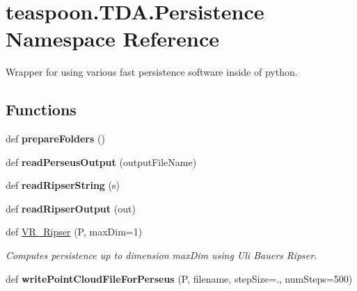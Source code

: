 \hypertarget{namespaceteaspoon_1_1_t_d_a_1_1_persistence}{}\section{teaspoon.\+T\+D\+A.\+Persistence Namespace Reference}
\label{namespaceteaspoon_1_1_t_d_a_1_1_persistence}


Wrapper for using various fast persistence software inside of python.  


\subsection*{Functions}
\begin{DoxyCompactItemize}
\item 
def {\bfseries prepare\+Folders} ()\hypertarget{namespaceteaspoon_1_1_t_d_a_1_1_persistence_aa767596a9f61323ef4e489e42890cd45}{}\label{namespaceteaspoon_1_1_t_d_a_1_1_persistence_aa767596a9f61323ef4e489e42890cd45}

\item 
def {\bfseries read\+Perseus\+Output} (output\+File\+Name)\hypertarget{namespaceteaspoon_1_1_t_d_a_1_1_persistence_a3d273210437e69be2df595ed1751c661}{}\label{namespaceteaspoon_1_1_t_d_a_1_1_persistence_a3d273210437e69be2df595ed1751c661}

\item 
def {\bfseries read\+Ripser\+String} (s)\hypertarget{namespaceteaspoon_1_1_t_d_a_1_1_persistence_a862eea03c953145bb9290c1681f1f850}{}\label{namespaceteaspoon_1_1_t_d_a_1_1_persistence_a862eea03c953145bb9290c1681f1f850}

\item 
def {\bfseries read\+Ripser\+Output} (out)\hypertarget{namespaceteaspoon_1_1_t_d_a_1_1_persistence_a4ea0e5c0180eff1391c4ac0cf126694c}{}\label{namespaceteaspoon_1_1_t_d_a_1_1_persistence_a4ea0e5c0180eff1391c4ac0cf126694c}

\item 
def \hyperlink{namespaceteaspoon_1_1_t_d_a_1_1_persistence_ae38f90d312da5c7fb8587a2f44e67b8a}{V\+R\+\_\+\+Ripser} (P, max\+Dim=1)
\begin{DoxyCompactList}\small\item\em Computes persistence up to dimension max\+Dim using Uli Bauer\textquotesingle{}s Ripser. \end{DoxyCompactList}\item 
def {\bfseries write\+Point\+Cloud\+File\+For\+Perseus} (P, filename, step\+Size=., num\+Steps=500)\hypertarget{namespaceteaspoon_1_1_t_d_a_1_1_persistence_a074e092c57bca5b1652c7b2a2c41f603}{}\label{namespaceteaspoon_1_1_t_d_a_1_1_persistence_a074e092c57bca5b1652c7b2a2c41f603}


\end{DoxyCompactItemize}
